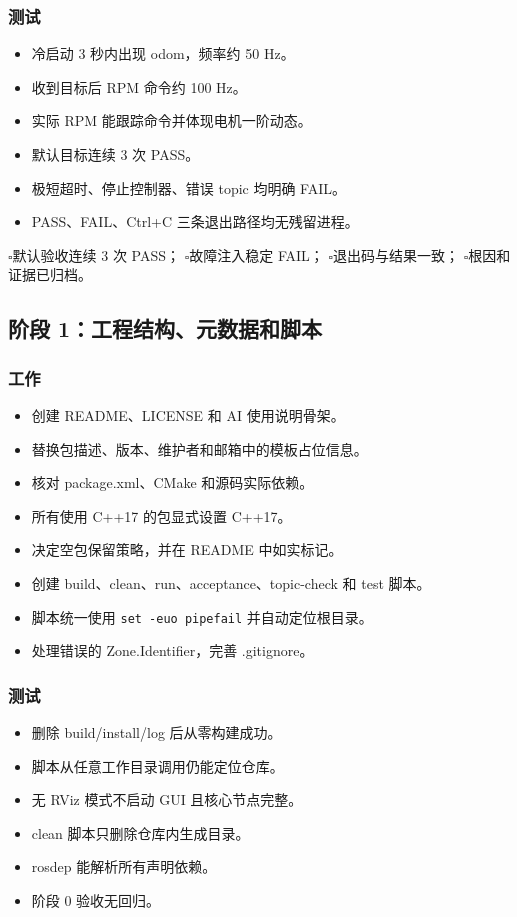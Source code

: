 \documentclass[UTF8,a4paper,12pt,fontset=fandol]{ctexart}
\newcommand{\unchecked}{\(\square\)}
\newcommand{\workitem}[1]{\item[\unchecked] #1}
\newcommand{\code}[1]{\texttt{#1}}
\begin{document}
\subsubsection{测试}
\begin{itemize}
  \workitem{冷启动 3 秒内出现 odom，频率约 50 Hz。}
  \workitem{收到目标后 RPM 命令约 100 Hz。}
  \workitem{实际 RPM 能跟踪命令并体现电机一阶动态。}
  \workitem{默认目标连续 3 次 PASS。}
  \workitem{极短超时、停止控制器、错误 topic 均明确 FAIL。}
  \workitem{PASS、FAIL、Ctrl+C 三条退出路径均无残留进程。}
\end{itemize}

\begin{gatebox}[阶段 0 出口]
\unchecked 默认验收连续 3 次 PASS；\quad
\unchecked 故障注入稳定 FAIL；\quad
\unchecked 退出码与结果一致；\quad
\unchecked 根因和证据已归档。
\end{gatebox}

\subsection{阶段 1：工程结构、元数据和脚本}

\subsubsection{工作}
\begin{itemize}
  \workitem{创建 README、LICENSE 和 AI 使用说明骨架。}
  \workitem{替换包描述、版本、维护者和邮箱中的模板占位信息。}
  \workitem{核对 package.xml、CMake 和源码实际依赖。}
  \workitem{所有使用 C++17 的包显式设置 C++17。}
  \workitem{决定空包保留策略，并在 README 中如实标记。}
  \workitem{创建 build、clean、run、acceptance、topic-check 和 test 脚本。}
  \workitem{脚本统一使用 \code{set -euo pipefail} 并自动定位根目录。}
  \workitem{处理错误的 Zone.Identifier，完善 .gitignore。}
\end{itemize}

\subsubsection{测试}
\begin{itemize}
  \workitem{删除 build/install/log 后从零构建成功。}
  \workitem{脚本从任意工作目录调用仍能定位仓库。}
  \workitem{无 RViz 模式不启动 GUI 且核心节点完整。}
  \workitem{clean 脚本只删除仓库内生成目录。}
  \workitem{rosdep 能解析所有声明依赖。}
  \workitem{阶段 0 验收无回归。}
\end{itemize}
\end{document}
